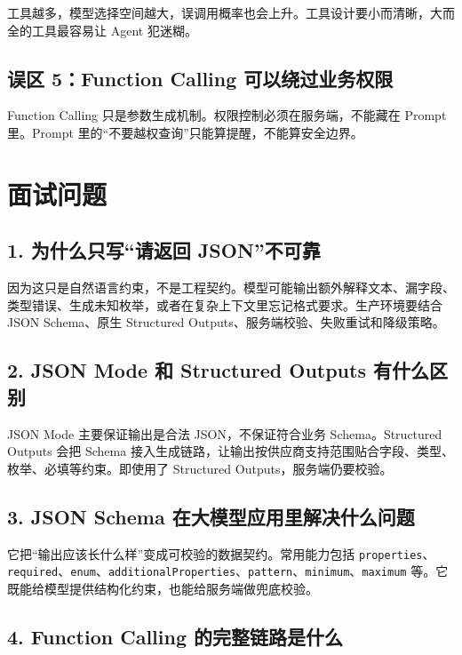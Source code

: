 \documentclass[10pt,a4paper]{ctexart}
\begin{document}
工具越多，模型选择空间越大，误调用概率也会上升。工具设计要小而清晰，大而全的工具最容易让 Agent 犯迷糊。



\subsection{误区 5：Function Calling 可以绕过业务权限}


Function Calling 只是参数生成机制。权限控制必须在服务端，不能藏在 Prompt 里。Prompt 里的“不要越权查询”只能算提醒，不能算安全边界。



\section{面试问题}


\subsection{1. 为什么只写“请返回 JSON”不可靠}


因为这只是自然语言约束，不是工程契约。模型可能输出额外解释文本、漏字段、类型错误、生成未知枚举，或者在复杂上下文里忘记格式要求。生产环境要结合 JSON Schema、原生 Structured Outputs、服务端校验、失败重试和降级策略。



\subsection{2. JSON Mode 和 Structured Outputs 有什么区别}


JSON Mode 主要保证输出是合法 JSON，不保证符合业务 Schema。Structured Outputs 会把 Schema 接入生成链路，让输出按供应商支持范围贴合字段、类型、枚举、必填等约束。即使用了 Structured Outputs，服务端仍要校验。



\subsection{3. JSON Schema 在大模型应用里解决什么问题}


它把“输出应该长什么样”变成可校验的数据契约。常用能力包括 \texttt{properties}、\texttt{required}、\texttt{enum}、\texttt{additionalProperties}、\texttt{pattern}、\texttt{minimum}、\texttt{maximum} 等。它既能给模型提供结构化约束，也能给服务端做兜底校验。



\subsection{4. Function Calling 的完整链路是什么}
\end{document}
